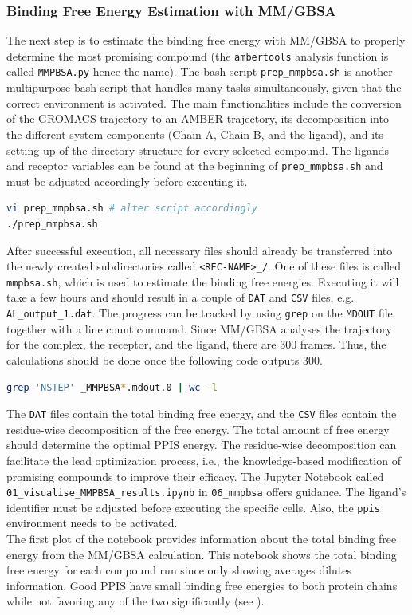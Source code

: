 \documentclass[9pt,tutorial]{livecoms}
\newcommand{\code}[1]{\colorbox{light-gray}{\texttt{#1}}}
\begin{document}
\subsubsection*{Binding Free Energy Estimation with MM/GBSA}
The next step is to estimate the binding free energy with MM/GBSA to properly determine the most promising compound (the \code{ambertools} analysis function is called \code{MMPBSA.py} hence the name). The bash script \code{prep\_mmpbsa.sh} is another multipurpose bash script that handles many tasks simultaneously, given that the correct environment is activated. The main functionalities include the conversion of the GROMACS trajectory to an AMBER trajectory, its decomposition into the different system components (Chain A, Chain B, and the ligand), and its setting up of the directory structure for every selected compound. The ligands and receptor variables can be found at the beginning of \code{prep\_mmpbsa.sh} and must be adjusted accordingly before executing it.
\begin{lstlisting}[language=bash]
vi prep_mmpbsa.sh # alter script accordingly
./prep_mmpbsa.sh
\end{lstlisting}
After successful execution, all necessary files should already be transferred into the newly created subdirectories called \code{<REC-NAME>\_<LIG-ID>/}. One of these files is called \code{mmpbsa.sh}, which is used to estimate the binding free energies. Executing it will take a few hours and should result in a couple of \texttt{DAT} and \texttt{CSV} files, e.g. \code{AL\_output\_1.dat}. The progress can be tracked by using \code{grep} on the \texttt{MDOUT} file together with a line count command. Since MM/GBSA analyses the trajectory for the complex, the receptor, and the ligand, there are 300 frames. Thus, the calculations should be done once the following code outputs 300.
\begin{lstlisting}[language=bash]
grep 'NSTEP' _MMPBSA*.mdout.0 | wc -l
\end{lstlisting}
The \texttt{DAT} files contain the total binding free energy, and the \texttt{CSV} files contain the residue-wise decomposition of the free energy. The total amount of free energy should determine the optimal PPIS energy. The residue-wise decomposition can facilitate the lead optimization process, i.e., the knowledge-based modification of promising compounds to improve their efficacy. The Jupyter Notebook called \code{01\_visualise\_MMPBSA\_results.ipynb} in \code{06\_mmpbsa} offers guidance. The ligand's identifier must be adjusted before executing the specific cells. Also, the \code{ppis} environment needs to be activated.\\
The first plot of the notebook provides information about the total binding free energy from the MM/GBSA calculation. This notebook shows the total binding free energy for each compound run since only showing averages dilutes information. Good PPIS have small binding free energies to both protein chains while not favoring any of the two significantly (see ).
\end{document}
